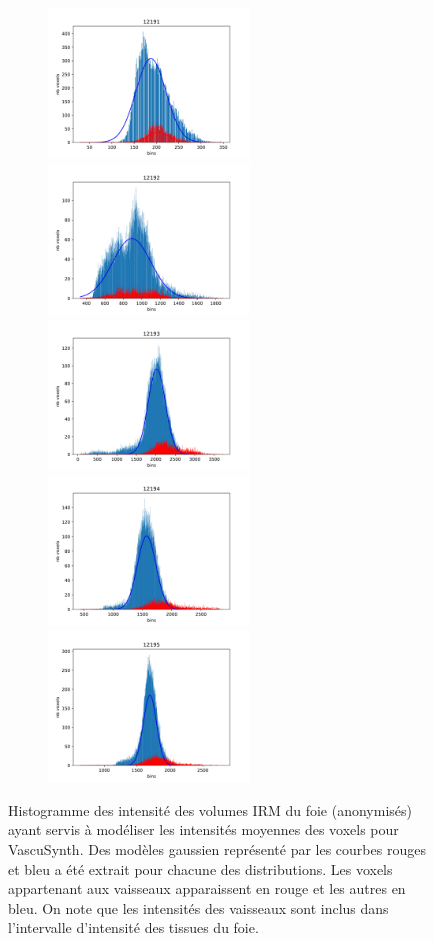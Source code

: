 \begin{figure}[!ht]
  \centering
  \begin{subfigure}{\textwidth}
    \centering
    \includegraphics[height=4cm]{Images/gen_12191.pdf}
    \includegraphics[height=4cm]{Images/gen_12192.pdf}
    \includegraphics[height=4cm]{Images/gen_12193.pdf}
    \includegraphics[height=4cm]{Images/gen_12194.pdf}
    \includegraphics[height=4cm]{Images/gen_12195.pdf}
  \end{subfigure}
  \caption{Histogramme des intensité des volumes IRM du foie (anonymisés) ayant servis à modéliser les intensités moyennes des voxels pour VascuSynth. Des modèles gaussien représenté par les courbes rouges et bleu a été extrait pour chacune des distributions. Les voxels appartenant aux vaisseaux apparaissent en rouge et les autres en bleu. On note que les intensités des vaisseaux sont inclus dans l'intervalle d'intensité des tissues du foie.}
  \label{fig:Distributions_mri_intensities}
\end{figure}
